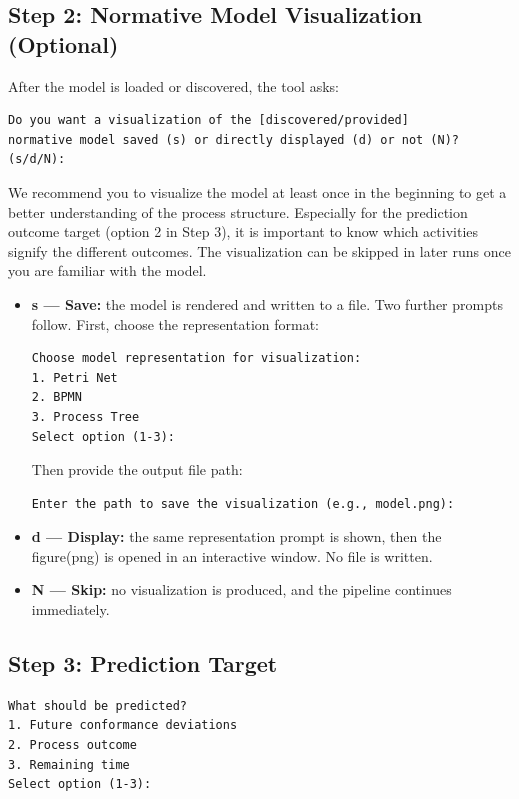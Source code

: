 \documentclass[12pt,a4paper]{article}
\begin{document}
\subsection{Step 2: Normative Model Visualization (Optional)}
After the model is loaded or discovered, the tool asks:
\begin{verbatim}
Do you want a visualization of the [discovered/provided]
normative model saved (s) or directly displayed (d) or not (N)?
(s/d/N):
\end{verbatim}
We recommend you to visualize the model at least once in the beginning to get a better understanding of the process structure. Especially for the prediction outcome target (option 2 in Step 3), it is important to know which activities signify the different outcomes. The visualization can be skipped in later runs once you are familiar with the model.
\begin{itemize}
    \item \textbf{s --- Save:} the model is rendered and written to a file. Two further prompts follow. First, choose the representation format:
    \begin{verbatim}
Choose model representation for visualization:
1. Petri Net
2. BPMN
3. Process Tree
Select option (1-3):
    \end{verbatim}
    Then provide the output file path:
    \begin{verbatim}
Enter the path to save the visualization (e.g., model.png):
    \end{verbatim}

    \item \textbf{d --- Display:} the same representation prompt is shown, then the figure(png) is opened in an interactive window. No file is written.

    \item \textbf{N --- Skip:} no visualization is produced, and the pipeline continues immediately.
\end{itemize}
\subsection{Step 3: Prediction Target}
\begin{verbatim}
What should be predicted?
1. Future conformance deviations
2. Process outcome
3. Remaining time
Select option (1-3):
\end{verbatim}
\end{document}
